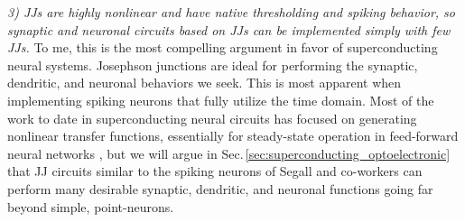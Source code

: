 \documentclass[twocolumn]{article}
\begin{document}
  \vspace{1em}
\textit{3) JJs are highly nonlinear and have native thresholding and spiking behavior, so synaptic and neuronal circuits based on JJs can be implemented simply with few JJs.} \newline To me, this is the most compelling argument in favor of superconducting neural systems. Josephson junctions are ideal for performing the synaptic, dendritic, and neuronal behaviors we seek. This is most apparent when implementing spiking neurons that fully utilize the time domain. Most of the work to date in superconducting neural circuits has focused on generating nonlinear transfer functions, essentially for steady-state operation in feed-forward neural networks \cite{hago1991,hiak1991,mina1994a,mina1994b,mina1995,rilo1997,koko2005,onko2009,onma2011,yaum2013,sckl2016,klsc2018,sosc2018,ru2016,scdo2018,scdo2018b,chgo2018}, but we will argue in Sec.\,\ref{sec:superconducting_optoelectronic} that JJ circuits similar to the spiking neurons of Segall and co-workers \cite{crsc2010,segu2014,sele2017} can perform many desirable synaptic, dendritic, and neuronal functions going far beyond simple, point-neurons.
\end{document}
